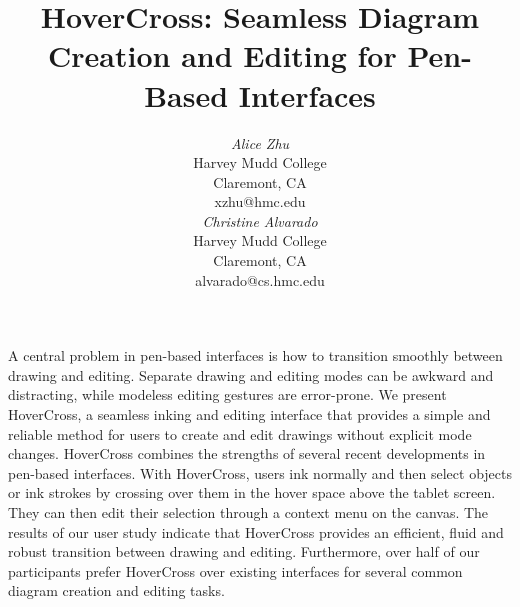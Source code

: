 \documentclass{article}
\begin{document}




\title{HoverCross: Seamless Diagram Creation and Editing for Pen-Based
       Interfaces}


\author{
\parbox[t]{7cm}{\centering
	     {\em Alice Zhu}\\
	     Harvey Mudd College\\
             Claremont, CA\\
	     xzhu@hmc.edu}
\parbox[t]{7cm}{\centering
	     {\em Christine Alvarado}\\
	     Harvey Mudd College\\
	     Claremont, CA\\
	     alvarado@cs.hmc.edu}
}

\maketitle

\abstract A central problem in pen-based interfaces is how to
transition smoothly between drawing and editing. Separate drawing and
editing modes can be awkward and distracting, while modeless editing
gestures are error-prone. We present HoverCross, a seamless inking and
editing interface that provides a simple and reliable method for users
to create and edit drawings without explicit mode changes.  HoverCross
combines the strengths of several recent developments in pen-based
interfaces.  With HoverCross, users ink normally and then select
objects or ink strokes by crossing over them in the hover space above
the tablet screen.  They can then edit their selection through a
context menu on the canvas.  The results of our user study indicate
that HoverCross provides an efficient, fluid and robust transition
between drawing and editing.  Furthermore, over half of our
participants prefer HoverCross over existing interfaces for several
common diagram creation and editing tasks.
\end{document}
